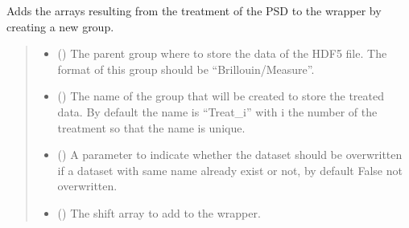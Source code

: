 \documentclass[letterpaper,10pt,english]{sphinxmanual}
\begin{document}
\begin{fulllineitems}
\begin{fulllineitems}
\label{\detokenize{_autosummary/HDF5_BLS.wrapper:HDF5_BLS.wrapper.Wrapper.add_treated_data}}
\pysigstartsignatures
\pysiglinewithargsret
{}
{\sphinxparamcomma {}\sphinxparamcomma {}\sphinxparamcomma {}}
{}
\pysigstopsignatures
\sphinxAtStartPar
Adds the arrays resulting from the treatment of the PSD to the wrapper by creating a new group.
\begin{quote}\begin{description}
\begin{itemize}
\item {} 
\sphinxAtStartPar
{} (\sphinxstyleliteralemphasis{\sphinxupquote{, }}) \textendash{} The parent group where to store the data of the HDF5 file. The format of this group should be “Brillouin/Measure”.

\item {} 
\sphinxAtStartPar
{} (\sphinxstyleliteralemphasis{\sphinxupquote{, }}) \textendash{} The name of the group that will be created to store the treated data. By default the name is “Treat\_i” with i the number of the treatment so that the name is unique.

\item {} 
\sphinxAtStartPar
{} (\sphinxstyleliteralemphasis{\sphinxupquote{, }}) \textendash{} A parameter to indicate whether the dataset should be overwritten if a dataset with same name already exist or not, by default False \sphinxhyphen{} not overwritten.

\item {} 
\sphinxAtStartPar
{} (\sphinxstyleliteralemphasis{\sphinxupquote{, }}) \textendash{} The shift array to add to the wrapper.


\end{itemize}
\end{description}
\end{quote}
\end{fulllineitems}
\end{fulllineitems}
\end{document}
